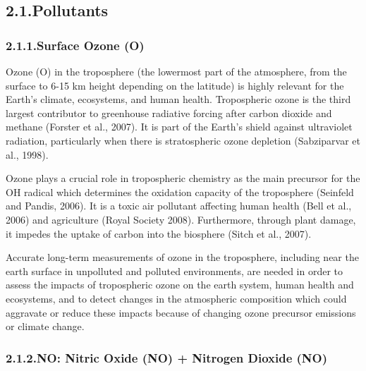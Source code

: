 \documentclass[9pt]{article}
\begin{document}
\subsection{2.1.\hspace*{0.5em}Pollutants}\label{sec-pollutants}%

\subsubsection{2.1.1.\hspace*{0.5em}Surface Ozone (O)}\label{sec-surface-ozone-o3}%

\noindent{}Ozone (O) in the troposphere (the lowermost part of the atmosphere, from the surface to 6-15 km height depending on the latitude) is highly relevant for the Earth’s climate, ecosystems, and human health.
Tropospheric ozone is the third largest contributor to greenhouse radiative forcing after carbon dioxide and methane (Forster et al., 2007).
It is part of the Earth’s shield against ultraviolet radiation, particularly when there is stratospheric ozone depletion (Sabziparvar et al., 1998).%

Ozone plays a crucial role in tropospheric chemistry as the main precursor for the OH radical which determines the oxidation capacity of the troposphere (Seinfeld and Pandis, 2006). 
It is a toxic air pollutant affecting human health (Bell et al., 2006) and agriculture (Royal Society 2008).
Furthermore, through plant damage, it impedes the uptake of carbon into the biosphere (Sitch et al., 2007).%

Accurate long-term measurements of ozone in the troposphere, including near the earth surface in unpolluted and polluted environments, are needed in order to assess the impacts of tropospheric ozone on the earth system, human health and ecosystems, and to detect changes in the atmospheric composition which could aggravate or reduce these impacts because of changing ozone precursor emissions or climate change.%

\subsubsection{2.1.2.\hspace*{0.5em}NO: Nitric Oxide (NO) + Nitrogen Dioxide (NO)}\label{sec-nox--nitric-oxide-no-nitrogen-dioxide-no2}%
\end{document}
